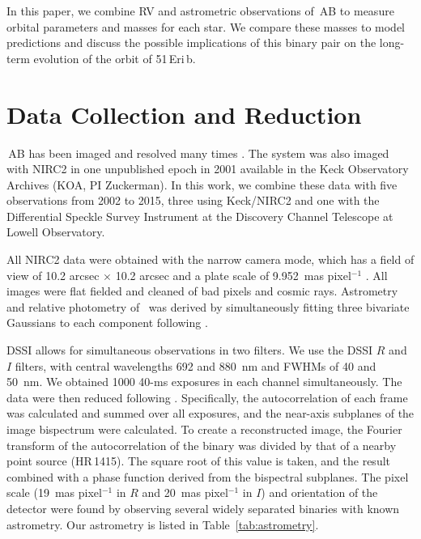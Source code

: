 In this paper, we combine RV and astrometric observations of \thisstarsix\,AB 
to measure orbital parameters and masses for each star. 
We compare these masses to model predictions and
discuss the possible implications of this binary pair on the long-term evolution of
the orbit of 51\,Eri\,b.


\section{Data Collection and Reduction}
\label{sec:data}

\thisstarsix\,AB has been imaged and resolved many times
\citep{Kasper07, Bergfors10, Delorme12, Janson12, Janson14a}. 
The system was also imaged with NIRC2 \citep{Wizinowich00} in one unpublished epoch
in 2001 available in the Keck Observatory Archives (KOA, PI Zuckerman). 
In this work, we combine these data with five observations from 2002 to 2015, three
using Keck/NIRC2 and one with the Differential Speckle Survey Instrument \citep[DSSI,][]{Horch09} at 
the Discovery Channel Telescope at Lowell Observatory.

All NIRC2 data were obtained with the narrow camera mode, which has a field of view 
of 10.2 arcsec $\times$ 10.2 arcsec and a plate scale of 9.952~mas pixel$^{-1}$
\citep{Yelda10}.  All images were flat fielded and cleaned of bad pixels and 
cosmic rays.  Astrometry and relative photometry of \thisstarsix\ was derived by 
simultaneously fitting three bivariate Gaussians to each component following 
\citet{Liu10}. 

DSSI allows for simultaneous observations in two filters.
We use the DSSI $R$ and $I$ filters, with central wavelengths
692 and 880~nm and FWHMs of 40 and 50~nm. 
We obtained 1000 40-ms exposures in each channel simultaneously.
The data were then reduced following \citet{Horch15}.
Specifically, the autocorrelation of each frame was calculated and summed over all
exposures, and the near-axis subplanes of the image bispectrum were 
calculated. 
To create a reconstructed image, the Fourier transform of the autocorrelation
of the binary was divided by that of a nearby point source (HR\,1415).
The square root of this value is taken, and the result combined with a phase function
derived from the bispectral subplanes.
The pixel scale (19~mas pixel$^{-1}$ in $R$ and 20~mas pixel$^{-1}$ in $I$) and orientation of the detector were found by observing
several widely separated binaries with known astrometry.
Our astrometry is listed in Table~\ref{tab:astrometry}.

